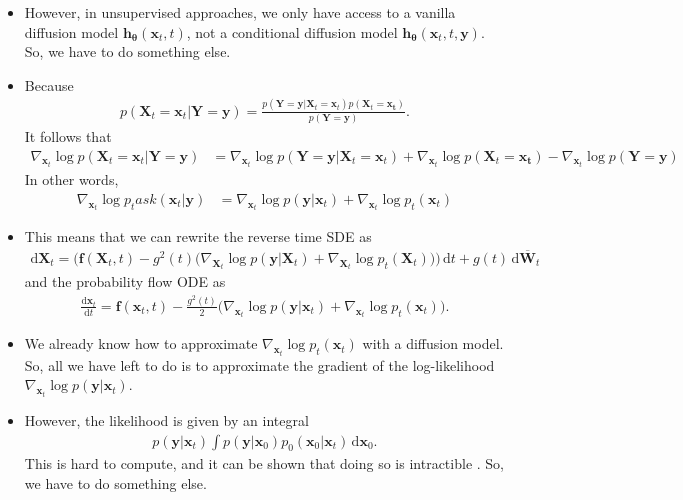 \documentclass[10pt]{article}
\newcommand{\dee}{\mathrm{d}}
\newcommand{\ve}[1]{\mathbf{#1}}
\newcommand{\ves}[1]{\boldsymbol{#1}}
\begin{document}
\begin{itemize}
  \item However, in unsupervised approaches, we only have access to a vanilla diffusion model $\ve{h}_{\ves{\theta}}(\ve{x}_t, t)$, not a conditional diffusion model $\ve{h}_{\ves{\theta}}(\ve{x}_t, t, \ve{y})$. So, we have to do something else.
  
  \item Because
  \begin{align*}
      p(\ve{X}_t = \ve{x}_t|\ve{Y} = \ve{y}) = \frac{p(\ve{Y} = \ve{y}|\ve{X}_t = \ve{x}_t) p(\ve{X}_t = \ve{x_t})}{p(\ve{Y} = \ve{y})}.
  \end{align*}
  It follows that
  \begin{align*}
    \nabla_{\ve{x}_t} \log p(\ve{X}_t = \ve{x}_t|\ve{Y} = \ve{y}) 
    &= \nabla_{\ve{x}_t} \log p(\ve{Y} = \ve{y}|\ve{X}_t = \ve{x}_t) + \nabla_{\ve{x}_t} \log p(\ve{X}_t = \ve{x_t}) - \nabla_{\ve{x}_t} \log p(\ve{Y} = \ve{y})    
  \end{align*}
  In other words,
  \begin{align}
    \nabla_{\ve{x}_t} \log p_task(\ve{x}_t|\ve{y}) 
    &= \nabla_{\ve{x}_t} \log p(\ve{y}|\ve{x}_t) + \nabla_{\ve{x}_t} \log p_t(\ve{x}_t)
  \end{align}

  \item This means that we can rewrite the reverse time SDE as
  \begin{align*}
    \dee \ve{X}_t = \Big( \ve{f}(\ve{X}_t, t) - g^2(t) \big( \nabla_{\ve{X}_t} \log p(\ve{y}|\ve{X}_t ) + \nabla_{\ve{X}_t} \log p_t(\ve{X}_t) \big) \Big)\, \dee t + g(t)\, \dee \overline{\ve{W}}_t
  \end{align*}
  and the probability flow ODE as
  \begin{align*}
    \frac{\dee \ve{x}_t}{\dee t} = \ve{f}(\ve{x}_t, t) - \frac{g^2(t)}{2} \big( \nabla_{\ve{x}_t} \log p(\ve{y}|\ve{x}_t) + \nabla_{\ve{x}_t} \log p_t(\ve{x}_t) \big).
  \end{align*}

  \item We already know how to approximate $\nabla_{\ve{x}_t} \log p_t(\ve{x}_t)$ with a diffusion model. So, all we have left to do is to approximate the gradient of the log-likelihood $\nabla_{\ve{x}_t} \log p(\ve{y}|\ve{x}_t)$.
  
  \item However, the likelihood is given by an integral
  \begin{align*}
    p(\ve{y}|\ve{x}_t) \int p(\ve{y}|\ve{x}_0) p_0(\ve{x}_0|\ve{x}_t)\, \dee \ve{x}_0.
  \end{align*}
  This is hard to compute, and it can be shown that doing so is intractible \cite{Gupta:2024}. So, we have to do something else.
\end{itemize}
\end{document}
